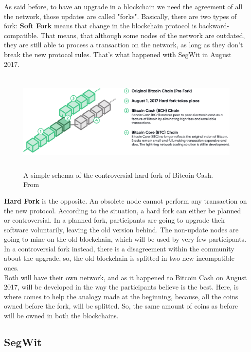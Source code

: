 As said before, to have an upgrade in a blockchain we need the agreement of all
the network, those updates are called "forks". Basically, there are two types 
of fork:
\bigskip 
\textbf{Soft Fork}
means that change in the blockchain protocol is backward-compatible. That means,
that although some nodes of the network are outdated, they are still able to 
process a transaction on the network, as long as they don't break the new protocol rules.
That's what happened with SegWit in August 2017.
\bigskip 
\begin{figure}
    \centering
    \includegraphics[height=5cm]{fork-img.png}
    \caption{A simple schema of the controversial hard fork of Bitcoin Cash. From \cite{bitcoin.com}}
    \label{fig:hardfork}
\end{figure}
\textbf{Hard Fork}
is the opposite. An obsolete node cannot perform any transaction on the new protocol.
According to the situation, a hard fork can either be planned or controversial.
In a planned fork, participants are going to upgrade their software voluntarily,
leaving the old version behind. The non-update nodes are going to mine on the old 
blockchain, which will be used by very few participants.\\
In a controversial fork instead, there is a disagreement within the community about
the upgrade, so, the old blockchain is splitted in two new incompatible ones.\\ 
Both will have their own network, and as it happened to Bitcoin Cash on August 2017, 
will be developed in the way the participants believe is the best. Here, is where 
comes to help the analogy made at the beginning, because, all the coins owned before 
the fork, will be splitted. So, the same amount of coins as before will be owned in 
both the blockchains.\cite{binancevision}


\subsection{SegWit}
\label{sec:segwit}

